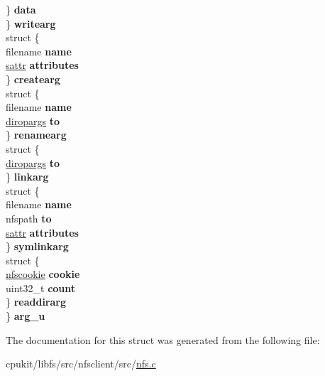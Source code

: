 \begin{DoxyCompactItemize}
\begin{tabbing}
\>\>\} {\bfseries data}\\
\>\} {\bfseries writearg}\\
\>struct \{\\
\>\>filename {\bfseries name}\\
\>\>\mbox{\hyperlink{structsattr}{sattr}} {\bfseries attributes}\\
\>\} {\bfseries createarg}\\
\>struct \{\\
\>\>filename {\bfseries name}\\
\>\>\mbox{\hyperlink{structdiropargs}{diropargs}} {\bfseries to}\\
\>\} {\bfseries renamearg}\\
\>struct \{\\
\>\>\mbox{\hyperlink{structdiropargs}{diropargs}} {\bfseries to}\\
\>\} {\bfseries linkarg}\\
\>struct \{\\
\>\>filename {\bfseries name}\\
\>\>nfspath {\bfseries to}\\
\>\>\mbox{\hyperlink{structsattr}{sattr}} {\bfseries attributes}\\
\>\} {\bfseries symlinkarg}\\
\>struct \{\\
\>\>\mbox{\hyperlink{structnfscookie}{nfscookie}} {\bfseries cookie}\\
\>\>uint32\_t {\bfseries count}\\
\>\} {\bfseries readdirarg}\\
\} {\bfseries arg\_u}\\

\end{tabbing}\end{DoxyCompactItemize}


The documentation for this struct was generated from the following file\+:\begin{DoxyCompactItemize}
\item 
cpukit/libfs/src/nfsclient/src/\mbox{\hyperlink{nfs_8c}{nfs.\+c}}\end{DoxyCompactItemize}
